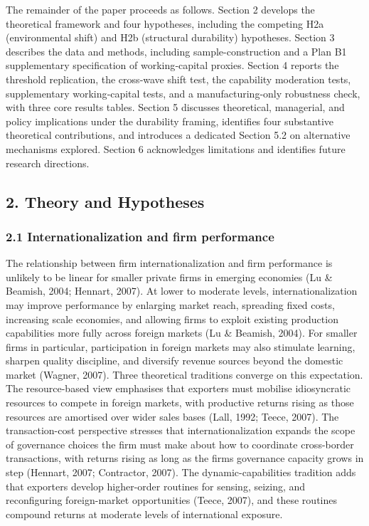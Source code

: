 \documentclass[12pt,a4paper]{article}
\begin{document}
The remainder of the paper proceeds as follows. Section 2 develops the
theoretical framework and four hypotheses, including the competing H2a
(environmental shift) and H2b (structural durability) hypotheses.
Section 3 describes the data and methods, including sample-construction
and a Plan B1 supplementary specification of working‑capital proxies.
Section 4 reports the threshold replication, the cross‑wave shift test,
the capability moderation tests, supplementary working‑capital tests,
and a manufacturing-only robustness check, with three core results
tables. Section 5 discusses theoretical, managerial, and policy
implications under the durability framing, identifies four substantive
theoretical contributions, and introduces a dedicated Section 5.2 on
alternative mechanisms explored. Section 6 acknowledges limitations and
identifies future research directions.

\hypertarget{2-theory-and-hypotheses}{%
\subsection{2. Theory and Hypotheses}\label{2-theory-and-hypotheses}}

\hypertarget{21-internationalization-and-firm-performance}{%
\subsubsection{2.1 Internationalization and firm
performance}\label{21-internationalization-and-firm-performance}}

The relationship between firm internationalization and firm performance
is unlikely to be linear for smaller private firms in emerging economies
(Lu \& Beamish, 2004; Hennart, 2007). At lower to moderate levels,
internationalization may improve performance by enlarging market reach,
spreading fixed costs, increasing scale economies, and allowing firms to
exploit existing production capabilities more fully across foreign
markets (Lu \& Beamish, 2004). For smaller firms in particular,
participation in foreign markets may also stimulate learning, sharpen
quality discipline, and diversify revenue sources beyond the domestic
market (Wagner, 2007). Three theoretical traditions converge on this
expectation. The resource-based view emphasises that exporters must
mobilise idiosyncratic resources to compete in foreign markets, with
productive returns rising as those resources are amortised over wider
sales bases (Lall, 1992; Teece, 2007). The transaction-cost perspective
stresses that internationalization expands the scope of governance
choices the firm must make about how to coordinate cross-border
transactions, with returns rising as long as the firm\textquotesingle s
governance capacity grows in step (Hennart, 2007; Contractor, 2007). The
dynamic-capabilities tradition adds that exporters develop higher-order
routines for sensing, seizing, and reconfiguring foreign-market
opportunities (Teece, 2007), and these routines compound returns at
moderate levels of international exposure.
\end{document}
